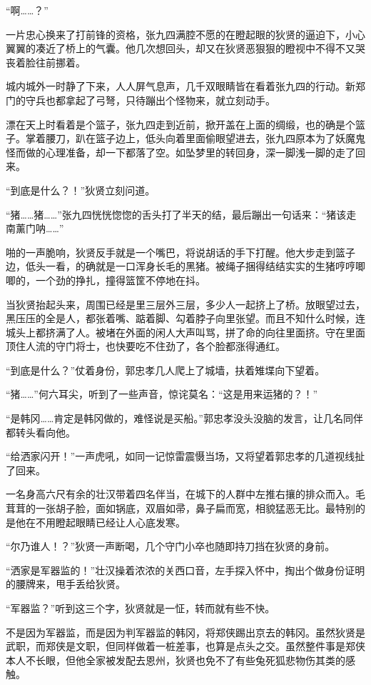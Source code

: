 “啊……？”

一片忠心换来了打前锋的资格，张九四满腔不愿的在瞪起眼的狄贤的逼迫下，小心翼翼的凑近了桥上的气囊。他几次想回头，却又在狄贤恶狠狠的瞪视中不得不又哭丧着脸往前挪着。

城内城外一时静了下来，人人屏气息声，几千双眼睛皆在看着张九四的行动。新郑门的守兵也都拿起了弓弩，只待蹦出个怪物来，就立刻动手。

漂在天上时看着是个篮子，张九四走到近前，掀开盖在上面的绸缎，也的确是个篮子。掌着腰刀，趴在篮子边上，低头向着里面偷眼望进去，张九四原本为了妖魔鬼怪而做的心理准备，却一下都落了空。如坠梦里的转回身，深一脚浅一脚的走了回来。

“到底是什么？！”狄贤立刻问道。

“猪……猪……”张九四恍恍惚惚的舌头打了半天的结，最后蹦出一句话来：“猪该走南薰门呐……”

啪的一声脆响，狄贤反手就是一个嘴巴，将说胡话的手下打醒。他大步走到篮子边，低头一看，的确就是一口浑身长毛的黑猪。被绳子捆得结结实实的生猪哼哼唧唧的，一个劲的挣扎，撞得篮筐不停地在抖。

当狄贤抬起头来，周围已经是里三层外三层，多少人一起挤上了桥。放眼望过去，黑压压的全是人，都张着嘴、踮着脚、勾着脖子向里张望。而且不知什么时候，连城头上都挤满了人。被堵在外面的闲人大声叫骂，拼了命的向往里面挤。守在里面顶住人流的守门将士，也快要吃不住劲了，各个脸都涨得通红。

“到底是什么？”仗着身份，郭忠孝几人爬上了城墙，扶着雉堞向下望着。

“猪……”何六耳尖，听到了一些声音，惊诧莫名：“这是用来运猪的？！”

“是韩冈……肯定是韩冈做的，难怪说是买船。”郭忠孝没头没脑的发言，让几名同伴都转头看向他。

“给洒家闪开！”一声虎吼，如同一记惊雷震慑当场，又将望着郭忠孝的几道视线扯了回来。

一名身高六尺有余的壮汉带着四名伴当，在城下的人群中左推右攘的排众而入。毛茸茸的一张胡子脸，面如锅底，双眉如帚，鼻子扁而宽，相貌猛恶无比。最特别的是他在不用瞪起眼睛已经让人心底发寒。

“尔乃谁人！？”狄贤一声断喝，几个守门小卒也随即持刀挡在狄贤的身前。

“洒家是军器监的！”壮汉操着浓浓的关西口音，左手探入怀中，掏出个做身份证明的腰牌来，甩手丢给狄贤。

“军器监？”听到这三个字，狄贤就是一怔，转而就有些不快。

不是因为军器监，而是因为判军器监的韩冈，将郑侠踢出京去的韩冈。虽然狄贤是武职，而郑侠是文职，但同样做着一桩差事，也算是点头之交。虽然整件事是郑侠本人不长眼，但他全家被发配去恩州，狄贤也免不了有些兔死狐悲物伤其类的感触。

